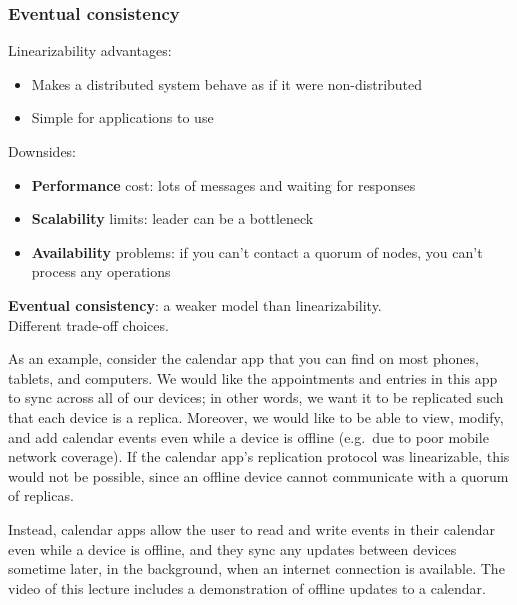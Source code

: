 \begin{frame}
    \label{s:eventual-1}
    \frametitle{Eventual consistency}
    Linearizability advantages:
    \begin{itemize}
        \item Makes a distributed system behave as if it were non-distributed
        \item Simple for applications to use\\[1em]\pause
    \end{itemize}
    Downsides:
    \begin{itemize}
        \item \textbf{Performance} cost: lots of messages and waiting for responses\pause
        \item \textbf{Scalability} limits: leader can be a bottleneck\pause
        \item \textbf{Availability} problems: if you can't contact a quorum of nodes, you can't process any operations\\[1em]\pause
    \end{itemize}
    \textbf{Eventual consistency}: a weaker model than linearizability.\\
    Different trade-off choices.
\end{frame}
\label{l:eventual-1}

As an example, consider the calendar app that you can find on most phones, tablets, and computers.
We would like the appointments and entries in this app to sync across all of our devices; in other words, we want it to be replicated such that each device is a replica.
Moreover, we would like to be able to view, modify, and add calendar events even while a device is offline (e.g.\ due to poor mobile network coverage).
If the calendar app's replication protocol was linearizable, this would not be possible, since an offline device cannot communicate with a quorum of replicas.

Instead, calendar apps allow the user to read and write events in their calendar even while a device is offline, and they sync any updates between devices sometime later, in the background, when an internet connection is available.
The video of this lecture includes a demonstration of offline updates to a calendar.

